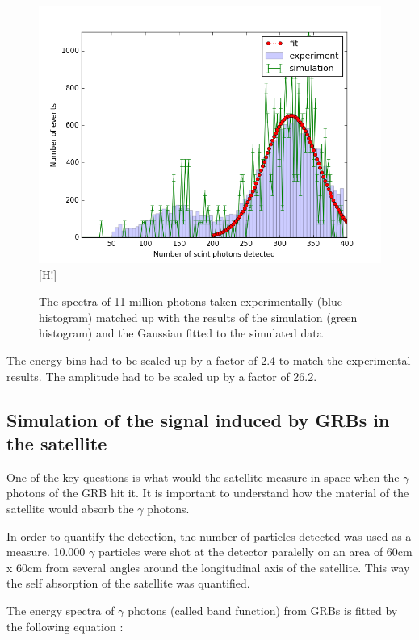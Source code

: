 \documentclass[12pt, a4paper,titlepage]{article}
\numberwithin{equation}{section}
\numberwithin{figure}{section}
\begin{document}
\begin{figure}[h!]
\includegraphics[width=150.0mm]{images/calibration_photon_yield.png}[H!]
\caption{The spectra of 11 million photons taken experimentally (blue histogram) matched up with the results of the simulation (green histogram) and the Gaussian fitted to the simulated data}
\end{figure}

The energy bins had to be scaled up by a factor of 2.4 to match the experimental results. The amplitude had to be scaled up by a factor of 26.2.

\pagebreak

\subsection{Simulation of the signal induced by GRBs in the satellite} \label{sec:grb}

One of the key questions is what would the satellite measure in space when the $\gamma$ photons of the GRB hit it. It is important to understand how the material of the satellite would absorb the $\gamma$ photons. 

In order to quantify the detection, the number of particles detected was used as a measure. 10.000 $\gamma$ particles were shot at the detector paralelly on an area of 60cm x 60cm from several angles around the longitudinal axis of the satellite. This way the self absorption of the satellite was quantified.

The energy spectra of $\gamma$ photons (called band function) from GRBs is fitted by the following equation \cite{band_func}:
\end{document}
